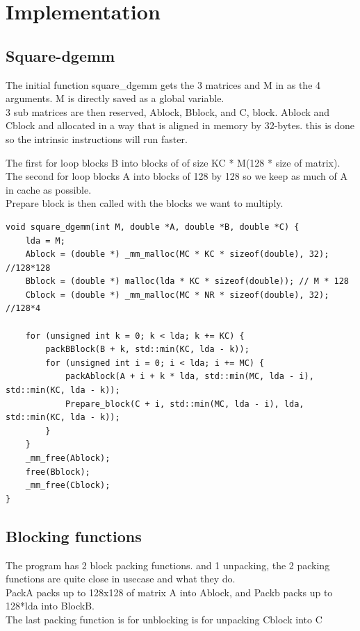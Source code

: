 \documentclass[a4paper,10pt,titlepage]{report}
\begin{document}
\section{Implementation}

\subsection{Square-dgemm}

The initial function square\_dgemm gets the 3 matrices and M in as the 4 arguments. M is directly saved as a global variable. \\
3 sub matrices are then reserved, Ablock, Bblock, and C, block. Ablock and Cblock and allocated in a way that is aligned in memory by 32-bytes. this is done so the intrinsic instructions will run faster. \\ \vspace{5mm}

The first for loop blocks B into blocks of of size KC * M(128 * size of matrix). The second for loop blocks A into blocks of 128 by 128 so we keep as much of A in cache as possible. \\

Prepare block is then called with the blocks we want to multiply.

\begin{lstlisting} 
void square_dgemm(int M, double *A, double *B, double *C) {
    lda = M;
    Ablock = (double *) _mm_malloc(MC * KC * sizeof(double), 32); //128*128
    Bblock = (double *) malloc(lda * KC * sizeof(double)); // M * 128
    Cblock = (double *) _mm_malloc(MC * NR * sizeof(double), 32); //128*4

    for (unsigned int k = 0; k < lda; k += KC) {
        packBBlock(B + k, std::min(KC, lda - k));
        for (unsigned int i = 0; i < lda; i += MC) {
            packAblock(A + i + k * lda, std::min(MC, lda - i), std::min(KC, lda - k));
            Prepare_block(C + i, std::min(MC, lda - i), lda, std::min(KC, lda - k));
        }
    }
    _mm_free(Ablock);
    free(Bblock);
    _mm_free(Cblock);
}
\end{lstlisting}

\subsection{Blocking functions}
The program has 2 block packing functions. and 1 unpacking, the 2 packing functions are quite close in usecase and what they do. \\
PackA packs up to 128x128 of matrix A into Ablock, and Packb packs up to 128*lda into BlockB.\\ \vspace{0mm}
The last packing function is for unblocking is for unpacking Cblock into C
\end{document}

